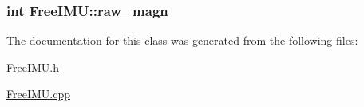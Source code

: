 \hypertarget{classFreeIMU_a8d115cb256ff28f33635fa58bf75589d}{
\subsubsection[{raw\-\_\-magn}]{\setlength{\rightskip}{0pt plus 5cm}int Free\-I\-M\-U\-::raw\-\_\-magn}}\label{classFreeIMU_a8d115cb256ff28f33635fa58bf75589d}


The documentation for this class was generated from the following files\-:\begin{DoxyCompactItemize}
\item 
\hyperlink{FreeIMU_8h}{Free\-I\-M\-U.\-h}\item 
\hyperlink{FreeIMU_8cpp}{Free\-I\-M\-U.\-cpp}\end{DoxyCompactItemize}
